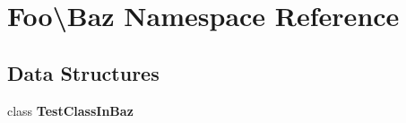 \section{Foo\textbackslash{}Baz Namespace Reference}
\label{namespace_foo_1_1_baz}
\subsection*{Data Structures}
\begin{DoxyCompactItemize}
\item 
class {\bf Test\+Class\+In\+Baz}
\end{DoxyCompactItemize}
